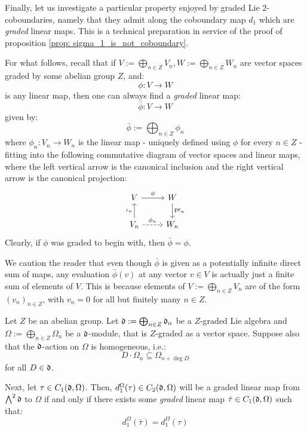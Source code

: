         Finally, let us investigate a particular property enjoyed by graded Lie $2$-coboundaries, namely that they admit  along the coboundary map $d_1$ which are \textit{graded} linear maps. This is a technical preparation in service of the proof of proposition \ref{prop: sigma_1_is_not_coboundary}.
        \begin{remark} \label{remark: grading_projections}
            For what follows, recall that if $V := \bigoplus_{n \in Z} V_n, W := \bigoplus_{n \in Z} W_n$ are vector spaces graded by some abelian group $Z$, and:
                $$\phi: V \to W$$
            is any linear map, then one can always find a \textit{graded} linear map:
                $$\bar{\phi}: V \to W$$
            given by:
                $$\bar{\phi} := \bigoplus_{n \in Z} \phi_n$$
            where $\phi_n: V_n \to W_n$ is the linear map - uniquely defined using $\phi$ for every $n \in Z$ - fitting into the following commutative diagram of vector spaces and linear maps, where the left vertical arrow is the canonical inclusion and the right vertical arrow is the canonical projection:
                $$
                    \begin{tikzcd}
                	V & W \\
                	{V_n} & {W_n}
                	\arrow["{\pr_n}", from=1-2, to=2-2]
                	\arrow["{\iota_n}", from=2-1, to=1-1]
                	\arrow["\phi_n", dashed, from=2-1, to=2-2]
                	\arrow["\phi", from=1-1, to=1-2]
                    \end{tikzcd}
                $$
            Clearly, if $\phi$ was graded to begin with, then $\bar{\phi} = \phi$.

            We caution the reader that even though $\bar{\phi}$ is given as a potentially infinite direct sum of maps, any evaluation $\bar{\phi}(v)$ at any vector $v \in V$ is actually just a finite sum of elements of $V$. This is because elements of $V := \bigoplus_{n \in Z} V_n$ are of the form $(v_n)_{n \in Z}$, with $v_n = 0$ for all but finitely many $n \in Z$.
        \end{remark}
        \begin{lemma} \label{lemma: graded_2_coboundaries}
            Let $Z$ be an abelian group. Let $\mathfrak{d} := \bigoplus_{n \in Z} \mathfrak{d}_n$ be a $Z$-graded Lie algebra and $\Omega := \bigoplus_{n \in Z} \Omega_n$ be a $\mathfrak{d}$-module, that is $Z$-graded as a vector space. Suppose also that the $\mathfrak{d}$-action on $\Omega$ is homogeneous, i.e.:
                $$D \cdot \Omega_n \subseteq \Omega_{n + \deg D}$$
            for all $D \in \mathfrak{d}$. 

            Next, let $\tau \in C_1(\mathfrak{d}, \Omega)$. Then, $d_1^{\Omega}(\tau) \in C_2(\mathfrak{d}, \Omega)$ will be a graded linear map from $\bigwedge^2 \mathfrak{d}$ to $\Omega$ if and only if there exists some \textit{graded} linear map $\bar{\tau} \in C_1(\mathfrak{d}, \Omega)$ such that:
                $$d_1^{\Omega}(\bar{\tau}) = d_1^{\Omega}(\tau)$$
        \end{lemma}
